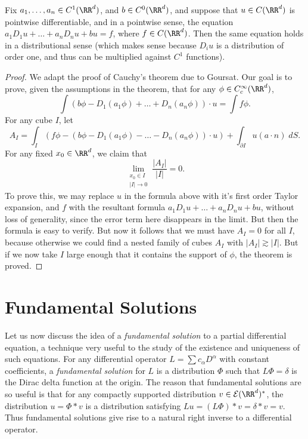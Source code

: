 \begin{theorem}
    Fix $a_1,\dots,a_n \in C^1(\RR^d)$, and $b \in C^0(\RR^d)$, and suppose that $u \in C(\RR^d)$ is pointwise differentiable, and in a pointwise sense, the equation $a_1 D_1 u + \dots + a_n D_n u + b u = f$, where $f \in C(\RR^d)$. Then the same equation holds in a distributional sense (which makes sense because $D_i u$ is a distribution of order one, and thus can be multiplied against $C^1$ functions).
\end{theorem}
\begin{proof}
    We adapt the proof of Cauchy's theorem due to Goursat. Our goal is to prove, given the assumptions in the theorem, that for any $\phi \in C_c^\infty(\RR^d)$,
    \[ \int (b \phi - D_1(a_1 \phi) + \dots + D_n(a_n \phi)) \cdot u = \int f \phi. \]
    For any cube $I$, let
    \[ A_I = \int_I (f \phi - (b \phi - D_1(a_1 \phi) - \dots - D_n(a_n \phi)) \cdot u) + \int_{\partial I} u (a \cdot n)\; dS. \]
    For any fixed $x_0 \in \RR^d$, we claim that
    \[ \lim_{\substack{x_0 \in I\\|I| \to 0}} \frac{|A_I|}{|I|} = 0. \]
    To prove this, we may replace $u$ in the formula above with it's first order Taylor expansion, and $f$ with the resultant formula $a_1 D_1 u + \dots + a_n D_n u + bu$, without loss of generality, since the error term here disappears in the limit. But then the formula is easy to verify. But now it follows that we must have $A_I = 0$ for all $I$, because otherwise we could find a nested family of cubes $A_I$ with $|A_I| \gtrsim |I|$. But if we now take $I$ large enough that it contains the support of $\phi$, the theorem is proved.
\end{proof}

\section{Fundamental Solutions}

Let us now discuss the idea of a \emph{fundamental solution} to a partial differential equation, a technique very useful to the study of the existence and uniqueness of such equations. For any differential operator $L = \sum c_\alpha D^\alpha$ with constant coefficients, a \emph{fundamental solution} for $L$ is a distribution $\Phi$ such that $L \Phi = \delta$ is the Dirac delta function at the origin. The reason that fundamental solutions are so useful is that for any compactly supported distribution $v \in \mathcal{E}(\RR^d)^*$, the distribution $u = \Phi * v$ is a distribution satisfying $L u = (L \Phi) * v = \delta * v = v$. Thus fundamental solutions give rise to a natural right inverse to a differential operator.

